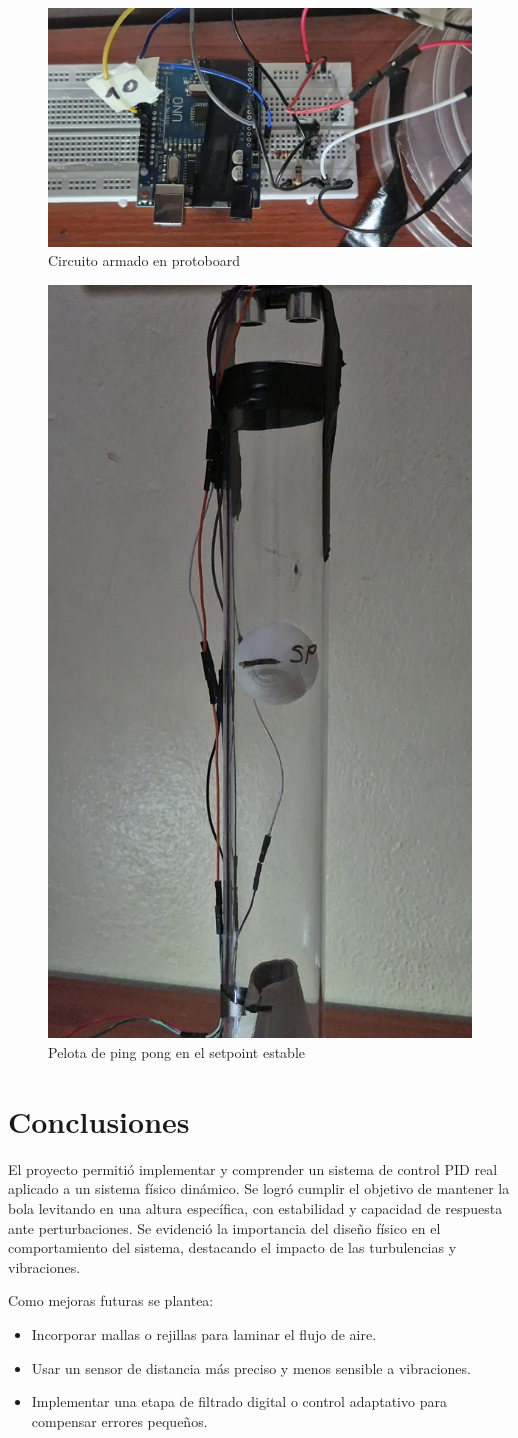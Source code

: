 \documentclass[12pt]{article}
\begin{document}
\begin{figure}[h!]
    \centering
    \includegraphics[width=0.7\linewidth]{imagenes/vlcsnap-2025-06-24-01h47m27s949.png}
    \caption{Circuito armado en protoboard}
\end{figure}

\begin{figure}[h!]
    \centering
    \includegraphics[width=0.4\linewidth]{imagenes/vlcsnap-2025-06-24-01h48m41s111.png}
    \caption{Pelota de ping pong en el setpoint estable}
\end{figure}

\newpage
\section*{Conclusiones}

El proyecto permitió implementar y comprender un sistema de control PID real aplicado a un sistema físico dinámico. Se logró cumplir el objetivo de mantener la bola levitando en una altura específica, con estabilidad y capacidad de respuesta ante perturbaciones. Se evidenció la importancia del diseño físico en el comportamiento del sistema, destacando el impacto de las turbulencias y vibraciones.

Como mejoras futuras se plantea:
\begin{itemize}
\item Incorporar mallas o rejillas para laminar el flujo de aire.
\item Usar un sensor de distancia más preciso y menos sensible a vibraciones.
\item Implementar una etapa de filtrado digital o control adaptativo para compensar errores pequeños.
\end{itemize}
\end{document}
